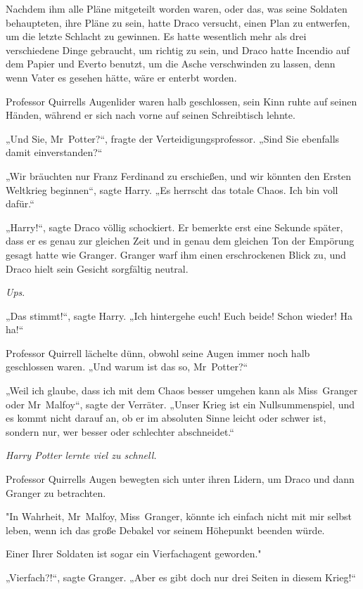 {Nachdem ihm alle Pläne mitgeteilt worden waren, oder das, was seine Soldaten behaupteten, ihre Pläne zu sein, hatte Draco versucht, einen Plan zu entwerfen, um die letzte Schlacht zu gewinnen. Es hatte wesentlich mehr als drei verschiedene Dinge gebraucht, um richtig zu sein, und Draco hatte Incendio auf dem Papier und Everto benutzt, um die Asche verschwinden zu lassen, denn wenn Vater es gesehen hätte, wäre er enterbt worden.

Professor Quirrells Augenlider waren halb geschlossen, sein Kinn ruhte auf seinen Händen, während er sich nach vorne auf seinen Schreibtisch lehnte.

„Und Sie, Mr~Potter?“, fragte der Verteidigungsprofessor. „Sind Sie ebenfalls damit einverstanden?“

„Wir bräuchten nur Franz Ferdinand zu erschießen, und wir könnten den Ersten Weltkrieg beginnen“, sagte Harry. „Es herrscht das totale Chaos. Ich bin voll dafür.“

„Harry!“, sagte Draco völlig schockiert. Er bemerkte erst eine Sekunde später, dass er es genau zur gleichen Zeit und in genau dem gleichen Ton der Empörung gesagt hatte wie Granger. Granger warf ihm einen erschrockenen Blick zu, und Draco hielt sein Gesicht sorgfältig neutral.

\emph{Ups}.

„Das stimmt!“, sagte Harry. „Ich hintergehe euch! Euch beide! Schon wieder! Ha ha!“

Professor Quirrell lächelte dünn, obwohl seine Augen immer noch halb geschlossen waren. „Und warum ist das so, Mr~Potter?“

„Weil ich glaube, dass ich mit dem Chaos besser umgehen kann als Miss~Granger oder Mr~Malfoy“, sagte der Verräter. „Unser Krieg ist ein Nullsummenspiel, und es kommt nicht darauf an, ob er im absoluten Sinne leicht oder schwer ist, sondern nur, wer besser oder schlechter abschneidet.“

\emph{Harry Potter lernte viel zu schnell.}

Professor Quirrells Augen bewegten sich unter ihren Lidern, um Draco und dann Granger zu betrachten.

"In Wahrheit, Mr~Malfoy, Miss~Granger, könnte ich einfach nicht mit mir selbst leben, wenn ich das große Debakel vor seinem Höhepunkt beenden würde.

Einer Ihrer Soldaten ist sogar ein Vierfachagent geworden."

„Vierfach?!“, sagte Granger. „Aber es gibt doch nur drei Seiten in diesem Krieg!“

}
